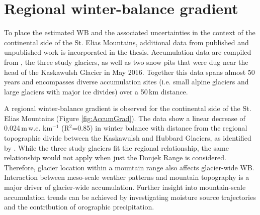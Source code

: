 \documentclass{sfuthesis}
\begin{document}

 \section{Regional winter-balance gradient}
 \label{sec:DonjekAccumGrad}

To place the estimated WB and the associated uncertainties in the context of the continental side of the St. Elias Mountains, additional data from published and unpublished work is incorporated in the thesis. Accumulation data are compiled from \cite{Taylor1969}, the three study glaciers, as well as two snow pits that were dug near the head of the Kaskawulsh Glacier in May 2016. Together this data spans almost 50 years and encompasses diverse accumulation sites (i.e. small alpine glaciers and large glaciers with major ice divides) over a 50\,km distance.

A regional winter-balance gradient is observed for the continental side of the St. Elias Mountains (Figure \ref{fig:AccumGrad}). The data show a linear decrease of 0.024\,m\,w.e. km$^{-1}$ (R$^2$=0.85) in winter balance with distance from the regional topographic divide between the Kaskawulsh and Hubbard Glaciers, as identified by \cite{Taylor1969}. While the three study glaciers fit the regional relationship, the same relationship would not apply when just the Donjek Range is considered. Therefore, glacier location within a mountain range also affects glacier-wide WB. Interaction between meso-scale weather patterns and mountain topography is a major driver of glacier-wide accumulation. Further insight into mountain-scale accumulation trends can be achieved by investigating moisture source trajectories and  the contribution of orographic precipitation. 
\end{document}
